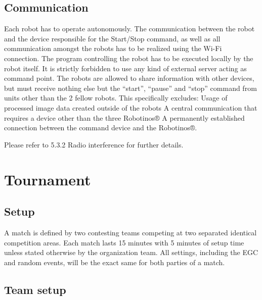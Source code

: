 \documentclass[12pt,twoside]{article}
\begin{document}
\subsection{Communication}

Each robot has to operate autonomously. The communication between the
robot and the device responsible for the Start/Stop command, as well
as all communication amongst the robots has to be realized using the
Wi-Fi connection. The program controlling the robot has to be executed
locally by the robot itself. It is strictly forbidden to use any kind
of external server acting as command point. The robots are allowed to
share information with other devices, but must receive nothing else
but the “start”, “pause” and “stop” command from units other than the
2 fellow robots. This specifically excludes: Usage of processed image
data created outside of the robots A central communication that
requires a device other than the three Robotinos® A permanently
established connection between the command device and the Robotinos®.

Please refer to 5.3.2 Radio interference for further details.


\section{Tournament}
\subsection{Setup}

A match is defined by two contesting teams competing at two separated
identical competition areas. Each match lasts 15 minutes with 5
minutes of setup time unless stated otherwise by the organization
team. All settings, including the EGC and random events, will be the
exact same for both parties of a match.

\subsection{Team setup}
\end{document}
